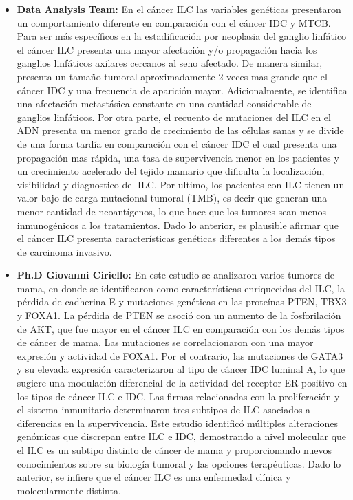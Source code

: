 \clearpage
{}
\begin{itemize}[label=\PencilRightDown]
	\item \textbf{Data Analysis Team:} En el cáncer ILC las variables genéticas presentaron un comportamiento diferente en comparación con el cáncer IDC y MTCB. Para ser más específicos en la estadificación por neoplasia del ganglio linfático el cáncer ILC presenta una mayor afectación y/o propagación hacia los ganglios linfáticos axilares cercanos al seno afectado. De manera similar, presenta un tamaño tumoral aproximadamente 2 veces mas grande que el cáncer IDC y una frecuencia de aparición mayor. Adicionalmente, se identifica una afectación metastásica constante en una cantidad considerable de ganglios linfáticos. Por otra parte, el recuento de mutaciones del ILC en el ADN presenta un menor grado de crecimiento de las células sanas y se divide de una forma tardía en comparación con el cáncer IDC el cual presenta una propagación mas rápida, una tasa de supervivencia menor en los pacientes y un crecimiento acelerado del tejido mamario que dificulta la localización, visibilidad y diagnostico del ILC. Por ultimo, los pacientes con ILC tienen un valor bajo de carga mutacional tumoral (TMB), es decir que generan una menor cantidad de neoantígenos, lo que hace que los tumores sean menos inmunogénicos a los tratamientos. Dado lo anterior, es plausible afirmar que el cáncer ILC presenta características genéticas diferentes a los demás tipos de carcinoma invasivo. 
	
	\item \textbf{Ph.D Giovanni Ciriello:} En este estudio se analizaron varios tumores de mama, en donde se identificaron como características enriquecidas del ILC, la pérdida de cadherina-E y mutaciones genéticas en las proteínas PTEN, TBX3 y FOXA1. La pérdida de PTEN se asoció con un aumento de la fosforilación de AKT, que fue mayor en el cáncer ILC en comparación  con los demás tipos de cáncer de mama. Las mutaciones se correlacionaron con una mayor expresión y actividad de FOXA1. Por el contrario, las mutaciones de GATA3 y su elevada expresión caracterizaron al tipo de cáncer IDC luminal A, lo que sugiere una modulación diferencial de la actividad del receptor ER positivo en los tipos de cáncer ILC e IDC. Las firmas relacionadas con la proliferación y el sistema inmunitario determinaron tres subtipos de ILC asociados a diferencias en la supervivencia. Este estudio identificó múltiples alteraciones genómicas que discrepan entre ILC e IDC, demostrando a nivel molecular que el ILC es un subtipo distinto de cáncer de mama y proporcionando nuevos conocimientos sobre su biología tumoral y las opciones terapéuticas. Dado lo anterior, se infiere que el cáncer ILC es una enfermedad clínica y molecularmente distinta\cite{Ciriello2015}.
\end{itemize}

